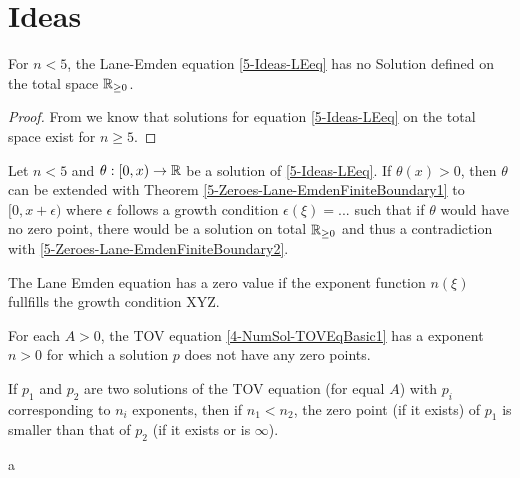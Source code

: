 \section{Ideas}

%
%
%
\begin{theorem}
	\label{5-Zeroes-Lane-EmdenFiniteBoundary2}
	For $n<5$, the Lane-Emden equation \ref{5-Ideas-LEeq} has no Solution defined on the total space $\mathbb{R}_{\geq0}$.
\end{theorem}
\begin{proof}
	From \cite{quittnerSuperlinearParabolicProblems2007a} we know that solutions for equation \ref{5-Ideas-LEeq} on the total space exist for $n\geq5$.
	
\end{proof}
%
%
%
\begin{theorem}
	\label{5-Zeroes-Lane-EmdenFiniteBoundary3}
	Let $n<5$ and $\theta:[0,x)\rightarrow\mathbb{R}$ be a solution of \ref{5-Ideas-LEeq}. If $\theta(x)>0$, then $\theta$ can be extended with Theorem \ref{5-Zeroes-Lane-EmdenFiniteBoundary1} 
	to $[0,x+\epsilon)$ where $\epsilon$ follows a growth condition $\epsilon(\xi)=...$ such that if $\theta$ would have no zero point, there would be a solution on total 
	$\mathbb{R}_{\geq0}$ and thus a contradiction with \ref{5-Zeroes-Lane-EmdenFiniteBoundary2}.
\end{theorem}
\begin{theorem}
	The Lane Emden equation has a zero value if the exponent function $n(\xi)$ fullfills the growth condition XYZ.
\end{theorem}


\begin{theorem}
	For each $A>0$, the TOV equation \ref{4-NumSol-TOVEqBasic1} has a exponent $n>0$ for which a solution $p$ does not have any zero points.
\end{theorem}
\begin{theorem}
	If $p_1$ and $p_2$ are two solutions of the TOV equation (for equal $A$) with $p_i$ corresponding to $n_i$ exponents, then if $n_1<n_2$, the zero 
	point (if it exists) of $p_1$ is smaller than that of $p_2$ (if it exists or is $\infty$).
\end{theorem}
\begin{theorem}
	a 
\end{theorem}




